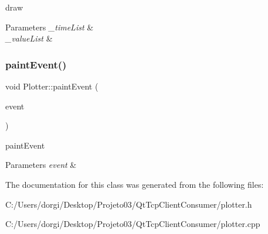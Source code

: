 draw 


\begin{DoxyParams}{Parameters}
{\em \+\_\+time\+List} & \\
\hline
{\em \+\_\+value\+List} & \\
\hline
\end{DoxyParams}
\mbox{\label{class_plotter_a06477bf987646f000a8982db1352a11d}} 
\subsubsection{\texorpdfstring{paint\+Event()}{paintEvent()}}
{\footnotesize\ttfamily void Plotter\+::paint\+Event (\begin{DoxyParamCaption}\item[{Q\+Paint\+Event $\ast$}]{event }\end{DoxyParamCaption})}



paint\+Event 


\begin{DoxyParams}{Parameters}
{\em event} & \\
\hline
\end{DoxyParams}


The documentation for this class was generated from the following files\+:\begin{DoxyCompactItemize}
\item 
C\+:/\+Users/dorgi/\+Desktop/\+Projeto03/\+Qt\+Tcp\+Client\+Consumer/plotter.\+h\item 
C\+:/\+Users/dorgi/\+Desktop/\+Projeto03/\+Qt\+Tcp\+Client\+Consumer/plotter.\+cpp\end{DoxyCompactItemize}
